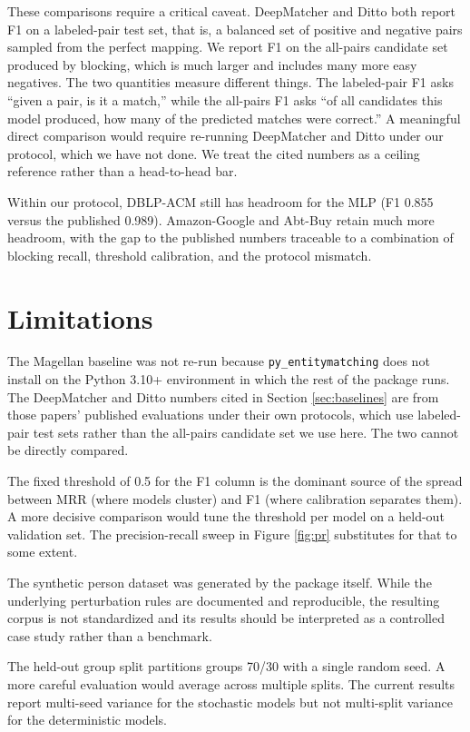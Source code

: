 \documentclass[10pt,letterpaper]{article}
\begin{document}
These comparisons require a critical caveat. DeepMatcher and Ditto
both report F1 on a labeled-pair test set, that is, a balanced set of
positive and negative pairs sampled from the perfect mapping. We
report F1 on the all-pairs candidate set produced by blocking, which
is much larger and includes many more easy negatives. The two
quantities measure different things. The labeled-pair F1 asks ``given
a pair, is it a match,'' while the all-pairs F1 asks ``of all
candidates this model produced, how many of the predicted matches
were correct.'' A meaningful direct comparison would require
re-running DeepMatcher and Ditto under our protocol, which we have not
done. We treat the cited numbers as a ceiling reference rather than a
head-to-head bar.

Within our protocol, DBLP-ACM still has headroom for the MLP (F1
0.855 versus the published 0.989). Amazon-Google and Abt-Buy retain
much more headroom, with the gap to
the published numbers traceable to a combination of blocking recall,
threshold calibration, and the protocol mismatch.

\section{Limitations}
\label{sec:limitations}

The Magellan baseline was not re-run because
\texttt{py\_entitymatching} does not install on the Python 3.10+
environment in which the rest of the package runs. The DeepMatcher
and Ditto numbers cited in Section \ref{sec:baselines} are from those
papers' published evaluations under their own protocols, which use
labeled-pair test sets rather than the all-pairs candidate set we use
here. The two cannot be directly compared.

The fixed threshold of 0.5 for the F1 column is the dominant source
of the spread between MRR (where models cluster) and F1 (where
calibration separates them). A more decisive comparison would tune
the threshold per model on a held-out validation set. The
precision-recall sweep in Figure \ref{fig:pr} substitutes for that to
some extent.

The synthetic person dataset was generated by the package itself.
While the underlying perturbation rules are documented and
reproducible, the resulting corpus is not standardized and its
results should be interpreted as a controlled case study rather than
a benchmark.

The held-out group split partitions groups 70/30 with a single random
seed. A more careful evaluation would average across multiple splits.
The current results report multi-seed variance for the stochastic
models but not multi-split variance for the deterministic models.
\end{document}
